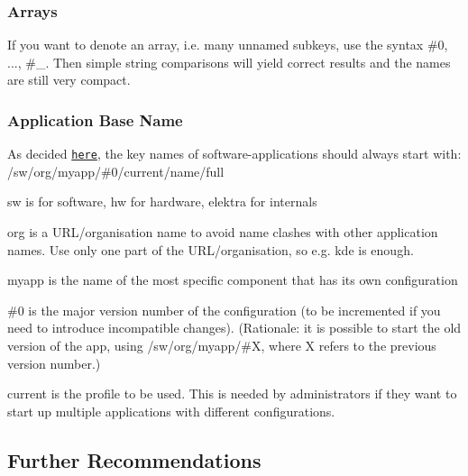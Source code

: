 \subsubsection*{Arrays}

If you want to denote an array, i.\+e. many unnamed subkeys, use the syntax {\ttfamily \#0}, ..., {\ttfamily \#\+\_}. Then simple string comparisons will yield correct results and the names are still very compact.

\subsubsection*{Application Base Name}

As decided \href{https://github.com/ElektraInitiative/libelektra/issues/302}{\tt here}, the key names of software-\/applications should always start with\+: {\ttfamily /sw/org/myapp/\#0/current/name/full}


\begin{DoxyItemize}
\item {\ttfamily sw} is for software, {\ttfamily hw} for hardware, {\ttfamily elektra} for internals
\item {\ttfamily org} is a U\+R\+L/organisation name to avoid name clashes with other application names. Use only one part of the U\+R\+L/organisation, so e.\+g. {\ttfamily kde} is enough.
\item {\ttfamily myapp} is the name of the most specific component that has its own configuration
\item {\ttfamily \#0} is the major version number of the configuration (to be incremented if you need to introduce incompatible changes). (Rationale\+: it is possible to start the old version of the app, using {\ttfamily /sw/org/myapp/\#\+X}, where {\ttfamily X} refers to the previous version number.)
\item {\ttfamily current} is the profile to be used. This is needed by administrators if they want to start up multiple applications with different configurations.
\end{DoxyItemize}

\subsection*{Further Recommendations}


